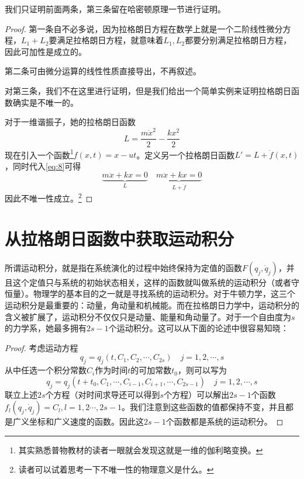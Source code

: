             我们只证明前面两条，第三条留在哈密顿原理一节进行证明。
            \begin{proof}
                第一条自不必多说，因为拉格朗日方程在数学上就是一个二阶线性微分方程，$L_1+L_2$要满足拉格朗日方程，就意味着$L_1,L_2$都要分别满足拉格朗日方程，因此可加性是成立的。
                
                第二条可由微分运算的线性性质直接导出，不再叙述。
                
                对第三条，我们不在这里进行证明，但是我们给出一个简单实例来证明拉格朗日函数确实是不唯一的。

                对于一维谐振子，她的拉格朗日函数
                \[
                L=\frac{m\dot{x}^2}{2}-\frac{kx^2}{2}
                \]
                现在引入一个函数\footnote{其实熟悉普物教材的读者一眼就会发现这就是一维的伽利略变换。}$f(x,t)=x-ut$。定义另一个拉格朗日函数$L'=L+\dot{f}(x,t)$，同时代入\ref{eq:8}可得
                \[
                \underbrace{m\ddot{x}+kx=0}_{L} \quad \underbrace{m\ddot{x}+kx=0}_{L+\dot{f}}
                \]
                因此不唯一性成立。\footnote{读者可以试着思考一下不唯一性的物理意义是什么。}
            \end{proof}
        
        \section{从拉格朗日函数中获取运动积分}
        所谓运动积分，就是指在系统演化的过程中始终保持为定值的函数$F(q_j,\dot{q}_j)$，并且这个定值只与系统的初始状态相关，这样的函数就叫做系统的运动积分（或者守恒量）。物理学的基本目的之一就是寻找系统的运动积分。对于牛顿力学，这三个运动积分是最重要的：动量，角动量和机械能。而在拉格朗日力学中，运动积分的含义被扩展了，运动积分不仅仅只是动量、能量和角动量了。对于一个自由度为$s$的力学系，她最多拥有$2s-1$个运动积分。这可以从下面的论述中很容易知晓：
        \begin{proof}
            考虑运动方程
            \[
            q_j=q_j(t,C_1,C_2,\cdots,C_{2s}) \quad j=1,2,\cdots,s
            \]
            从中任选一个积分常数$C_i$作为时间$t$的可加常数$t_0$，则可以写为
            \[
            q_j=q_j(t+t_0,C_1,\cdots,C_{i-1},C_{i+1},\cdots,C_{2s-1}) \quad j=1,2,\cdots,s
            \]
            联立上述$2s$个方程（对时间求导还可以得到$s$个方程）可以解出$2s-1$个函数$f_l(q_j,\dot{q}_j)=C_l,l=1,2\cdots,2s-1$。我们注意到这些函数的值都保持不变，并且都是广义坐标和广义速度的函数。因此这$2s-1$个函数都是系统的运动积分。
        \end{proof}

